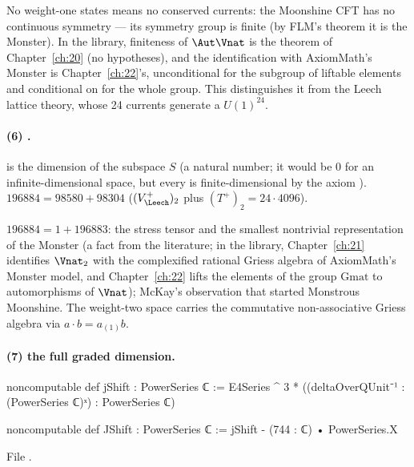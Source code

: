 \begin{physics}
No weight-one states means no conserved currents: the Moonshine CFT has no continuous symmetry —
its symmetry group is finite (by FLM's theorem it is the Monster).  In the library, finiteness of $\Aut\Vnat$ is the
theorem  of Chapter~\ref{ch:20} (no hypotheses), and the identification with AxiomMath's
Monster is Chapter~\ref{ch:22}'s, unconditional for the subgroup of liftable elements and conditional on
 for the whole group.  This distinguishes it from the Leech lattice theory, whose 24
currents generate a $U(1)^{24}$.
\end{physics}

\paragraph{(6) .}   is the dimension
of the subspace $S$ (a natural number; it would be $0$ for an infinite-dimensional space, but every
 is finite-dimensional by the axiom ).  $196884=98580+98304$
($(V_\Leech^+)_2$ plus $(T^+)_2=24\cdot4096$).

\begin{physics}
$196884=1+196883$: the stress tensor and the smallest nontrivial representation of the Monster
(a fact from the literature; in the library, Chapter~\ref{ch:21} identifies $\Vnat_2$ with the complexified
rational Griess algebra of AxiomMath's Monster model, and Chapter~\ref{ch:22} lifts the elements of the group
$\mathrm{Gmat}$ to automorphisms of $\Vnat$);
McKay's observation that started Monstrous Moonshine.  The weight-two space carries the
commutative non-associative Griess algebra via $a\cdot b=a_{(1)}b$.
\end{physics}

\paragraph{(7) the full graded dimension.}
\begin{leancode}
noncomputable def jShift : PowerSeries ℂ :=
  E4Series ^ 3 * ((deltaOverQUnit⁻¹ : (PowerSeries ℂ)ˣ) : PowerSeries ℂ)

noncomputable def JShift : PowerSeries ℂ := jShift - (744 : ℂ) • PowerSeries.X
\end{leancode}
File .

